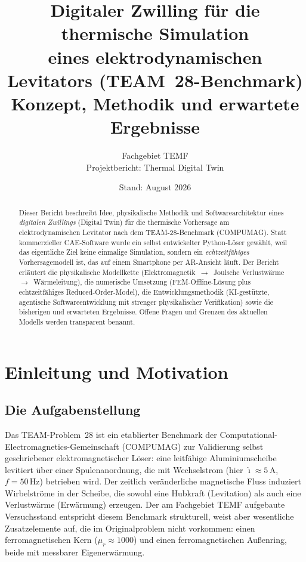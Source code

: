\documentclass[a4paper,11pt]{article}
\title{\textbf{Digitaler Zwilling für die thermische Simulation \\
eines elektrodynamischen Levitators (TEAM~28-Benchmark)} \\[0.3em]
\large Konzept, Methodik und erwartete Ergebnisse}
\author{Fachgebiet TEMF \\ Projektbericht: Thermal Digital Twin}
\date{Stand: August 2026}
\begin{document}
\maketitle

\begin{abstract}
\noindent
Dieser Bericht beschreibt Idee, physikalische Methodik und Softwarearchitektur
eines \emph{digitalen Zwillings} (Digital Twin) für die thermische Vorhersage
am elektrodynamischen Levitator nach dem TEAM-28-Benchmark (COMPUMAG). Statt
kommerzieller CAE-Software wurde ein selbst entwickelter Python-Löser gewählt,
weil das eigentliche Ziel keine einmalige Simulation, sondern ein
\emph{echtzeitfähiges} Vorhersagemodell ist, das auf einem Smartphone per
AR-Ansicht läuft. Der Bericht erläutert die physikalische Modellkette
(Elektromagnetik~$\to$~Joulsche Verlustwärme~$\to$~Wärmeleitung), die
numerische Umsetzung (FEM-Offline-Lösung plus echtzeitfähiges Reduced-Order-Model),
die Entwicklungsmethodik (KI-gestützte, agentische Softwareentwicklung mit
strenger physikalischer Verifikation) sowie die bisherigen und erwarteten
Ergebnisse. Offene Fragen und Grenzen des aktuellen Modells werden transparent
benannt.
\end{abstract}

\tableofcontents
\clearpage

\section{Einleitung und Motivation}

\subsection{Die Aufgabenstellung}
Das TEAM-Problem~28 ist ein etablierter Benchmark der
Computational-Electromagnetics-Gemeinschaft (COMPUMAG) zur Validierung
selbst geschriebener elektromagnetischer Löser: eine leitfähige Aluminiumscheibe
levitiert über einer Spulenanordnung, die mit Wechselstrom (hier $\hat{\imath}
\approx 5\,\mathrm{A}$, $f = 50\,\mathrm{Hz}$) betrieben wird. Der zeitlich
veränderliche magnetische Fluss induziert Wirbelströme in der Scheibe, die
sowohl eine Hubkraft (Levitation) als auch eine Verlustwärme (Erwärmung)
erzeugen. Der am Fachgebiet TEMF aufgebaute Versuchsstand entspricht diesem
Benchmark strukturell, weist aber wesentliche Zusatzelemente auf, die im
Originalproblem nicht vorkommen: einen ferromagnetischen Kern
($\mu_r \approx 1000$) und einen ferromagnetischen Außenring, beide mit
messbarer Eigenerwärmung.
\end{document}

